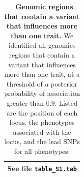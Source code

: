 \documentclass[11pt,titlepage]{article}
\begin{document}
\clearpage
\begin{center}
\begin{table}
\tiny{
    \begin{tabular}{| c|}
       \hline
 	See file \texttt{table\_S1.tab} \\
       \hline
        
    \end{tabular}
    }
      \caption{. \textbf{Genomic regions that contain a variant that influences more than one trait.} We identified all genomics regions that contain a variant that influences more than one trait, at a threshold of a posterior probability of association greater than 0.9. Listed are the position of each locus, the phenotypes associated with the locus, and the lead SNPs for all phenotypes.} 
\end{table}
\end{center}

\clearpage
\end{document}

